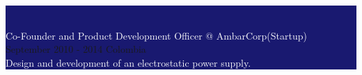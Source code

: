 \documentclass[letterpaper]{article}
\begin{document}
\colorbox{Gray}{
}
\vspace{2ex}


\begin{minipage}[t]{1.\linewidth} %
%
\begin{minipage}{0.47\linewidth}
\vspace{3ex}
\colorbox{MidnightBlue}{
\begin{minipage}{1\linewidth} %
	\begin{minipage}[t]{1\linewidth}
		\vspace{2ex}
		\\
		\vspace{2ex}
		\begin{minipage}{0.9\linewidth}
			{\normalsize \textcolor{white}{Co-Founder and Product 
			Development Officer @ AmbarCorp(Startup)}}\\
			{\small\textcolor{gray!40}{September 2010 - 2014 \hfill Colombia}}\\
			{\small\textcolor{white}{Design and development of an electrostatic 
			power supply.}}\\
			\vspace{4ex}
		\end{minipage} 		
	\end{minipage}	
	\begin{minipage}{1\linewidth} %


\end{minipage}
\end{minipage}}
\end{minipage}
\end{minipage}
\end{document}
